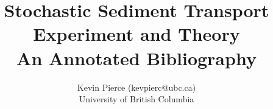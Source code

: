 \documentclass [11pt]{article}
\title{Stochastic Sediment Transport Experiment and Theory 
\\\medskip An Annotated Bibliography}
\author{Kevin Pierce (kevpierc@ubc.ca)\\University of British Columbia}
\begin{document}
\maketitle
\nocite{*}


\end{document}
